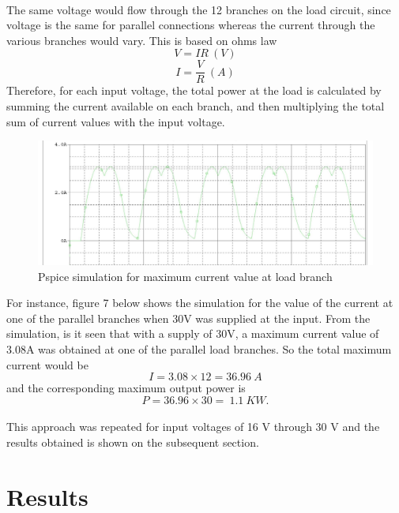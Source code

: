 \documentclass[titlepage]{article}
\begin{document}
\paragraph{} The same voltage would flow through the 12 branches on the load circuit, since voltage is the same for parallel connections whereas the current through the various branches would vary. This is based on ohms law 
\begin{equation}\label{}
V = IR~(V)
\end{equation}
\begin{equation}\label{}
I = \frac{V}{R}~(A)
\end{equation}
Therefore, for each input voltage, the total power at the load is calculated by summing the current available on each branch, and then multiplying the total sum of current values with the input voltage.
\begin{figure}[h!]
\centering
\includegraphics[scale=0.5]{pspice1.jpg}
\caption{Pspice simulation for maximum current value at load branch}
\label{pspice1}
\end{figure}
For instance, figure 7 below shows the simulation for the value of the current at one of the parallel branches when 30V was supplied at the input. From the simulation, is it seen that with a supply of 30V, a maximum current value of 3.08A was obtained at one of the parallel load branches. So the total maximum current would be $$ I = 3.08 \times 12 = 36.96~A$$ and the corresponding maximum output power is $$  P = 36.96 \times 30=~1.1~KW. $$
\paragraph{}This approach was repeated for input voltages of 16 V through 30 V and the results obtained is shown on the subsequent section.
\clearpage
\section{Results}
\end{document}

